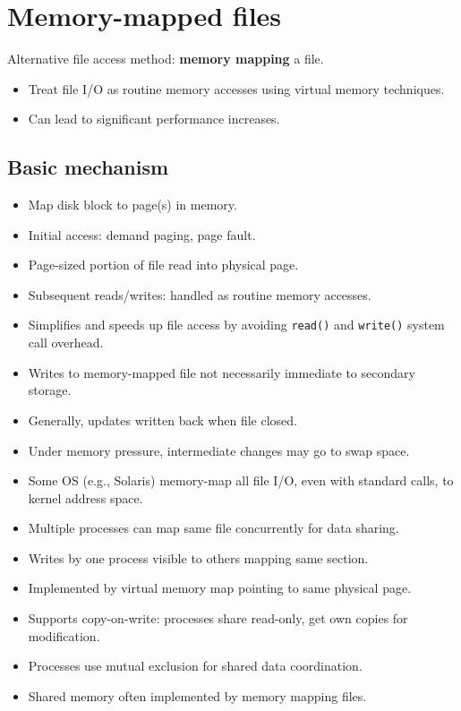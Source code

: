 \section{Memory-mapped files}

Alternative file access method: \textbf{memory mapping} a file.
\begin{itemize}
    \item Treat file I/O as routine memory accesses using virtual memory techniques.
    \item Can lead to significant performance increases.
\end{itemize}

\subsection{Basic mechanism}
\begin{itemize}
    \item Map disk block to page(s) in memory.
    \item Initial access: demand paging, page fault.
    \item Page-sized portion of file read into physical page.
    \item Subsequent reads/writes: handled as routine memory accesses.
    \item Simplifies and speeds up file access by avoiding \texttt{read()} and \texttt{write()} system call overhead.
    \item Writes to memory-mapped file not necessarily immediate to secondary storage.
    \item Generally, updates written back when file closed.
    \item Under memory pressure, intermediate changes may go to swap space.
    \item Some OS (e.g., Solaris) memory-map all file I/O, even with standard calls, to kernel address space.
    \item Multiple processes can map same file concurrently for data sharing.
    \item Writes by one process visible to others mapping same section.
    \item Implemented by virtual memory map pointing to same physical page.
    \item Supports copy-on-write: processes share read-only, get own copies for modification.
    \item Processes use mutual exclusion for shared data coordination.
    \item Shared memory often implemented by memory mapping files.
\end{itemize}

